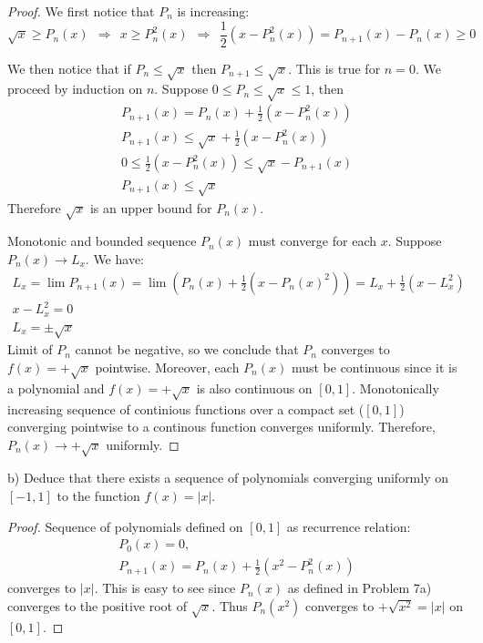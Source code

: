 \documentclass{article}
\begin{document}
\begin{proof}

We first notice that $P_n$ is increasing:
\[
    \sqrt{x} \geq P_n(x) \>\> 
    \Rightarrow \>\> x \geq P_n^2(x) \>\> 
    \Rightarrow \>\> \frac{1}{2} \left( x - P_n^2(x) \right) 
    = P_{n+1}(x) - P_n(x) \geq 0
\]

We then notice that if $P_n \leq \sqrt{x}$ then $P_{n+1} \leq \sqrt{x}$. This is true for $n=0$.
We proceed by induction on $n$.
Suppose $0 \leq P_n \leq \sqrt{x} \leq 1$, then
\begin{gather*}
    P_{n+1}(x) = P_n(x) + \frac{1}{2} \left( x-P_n^2(x) \right) \\
    P_{n+1}(x) \leq \sqrt{x} + \frac{1}{2} \left( x-P_n^2(x) \right) \\
    0 \leq \frac{1}{2} \left( x-P_n^2(x) \right) \leq \sqrt{x} - P_{n+1}(x) \\
    P_{n+1}(x) \leq \sqrt{x}
\end{gather*}
Therefore $\sqrt{x}$ is an upper bound for $P_n(x)$.

Monotonic and bounded sequence $P_n(x)$ must converge for each $x$.
Suppose $P_n(x) \to L_x$. We have:
\begin{gather*}
    L_x =  \lim P_{n+1}(x) = \lim \left( P_n(x) + \frac{1}{2} ( x - P_n(x)^2 ) \right) = L_x + \frac{1}{2} ( x - L_x^2 ) \\
    x - L_x^2 = 0 \\
    L_x = \pm \sqrt{x}
\end{gather*}
Limit of $P_n$ cannot be negative, so we conclude that $P_n$ converges to $f(x) = +\sqrt{x}$ pointwise.
Moreover, each $P_n(x)$ must be continuous since it is a polynomial and $f(x) = +\sqrt{x}$ is also continuous on $[0,1]$.
Monotonically increasing sequence of continious functions over a compact set ($[0,1]$) converging pointwise to a continous function converges uniformly. 
Therefore, $P_n(x) \to +\sqrt{x}$ uniformly.

\end{proof}

\begin{tcolorbox}
b) Deduce that there exists a sequence of polynomials converging uniformly on $[-1, 1]$ to the function $f(x) = |x|$.
\end{tcolorbox}

\begin{proof}

Sequence of polynomials defined on $[0,1]$ as recurrence relation:
\begin{gather*}
    P_0(x) = 0, \\
    P_{n+1}(x) = P_n(x) + \frac{1}{2} \left( x^2-P_n^2(x) \right)
\end{gather*}
converges to $|x|$.
This is easy to see since $P_n(x)$ as defined in Problem 7a) converges to the positive root of $\sqrt{x}$.
Thus $P_n(x^2)$ converges to $+\sqrt{x^2} = |x|$ on $[0,1]$.

\end{proof}
\end{document}
